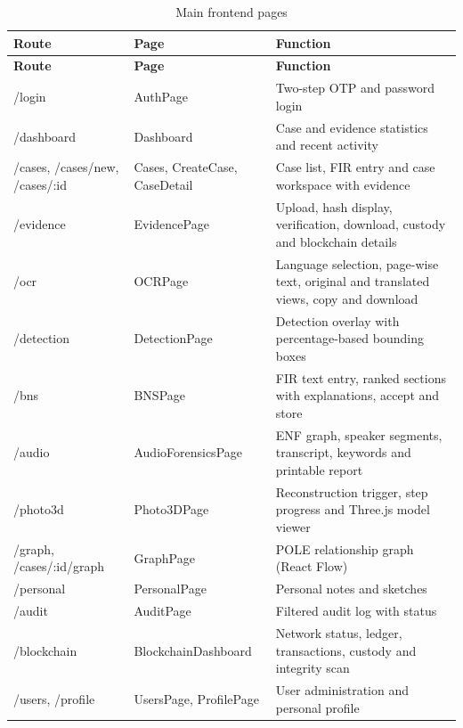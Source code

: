 \documentclass[12pt,a4paper,oneside]{report}
\begin{document}
{\footnotesize
\setlength{\tabcolsep}{3pt}
\renewcommand{\arraystretch}{1.15}
\begin{longtable}{|>{\raggedright\arraybackslash}p{4.17cm}|>{\raggedright\arraybackslash}p{3.41cm}|>{\raggedright\arraybackslash}p{6.63cm}|}
\caption{Main frontend pages}\\
\hline
\rowcolor{headfill}\textbf{Route} & \textbf{Page} & \textbf{Function} \\ \hline
\endfirsthead
\hline
\rowcolor{headfill}\textbf{Route} & \textbf{Page} & \textbf{Function} \\ \hline
\endhead
\hline \endfoot
/login & AuthPage & Two-step OTP and password login \\ \hline
/dashboard & Dashboard & Case and evidence statistics and recent activity \\ \hline
/cases, /cases/new, /cases/:id & Cases, CreateCase, CaseDetail & Case list, FIR entry and case workspace with evidence \\ \hline
/evidence & EvidencePage & Upload, hash display, verification, download, custody and blockchain details \\ \hline
/ocr & OCRPage & Language selection, page-wise text, original and translated views, copy and download \\ \hline
/detection & DetectionPage & Detection overlay with percentage-based bounding boxes \\ \hline
/bns & BNSPage & FIR text entry, ranked sections with explanations, accept and store \\ \hline
/audio & AudioForensicsPage & ENF graph, speaker segments, transcript, keywords and printable report \\ \hline
/photo3d & Photo3DPage & Reconstruction trigger, step progress and Three.js model viewer \\ \hline
/graph, /cases/:id/graph & GraphPage & POLE relationship graph (React Flow) \\ \hline
/personal & PersonalPage & Personal notes and sketches \\ \hline
/audit & AuditPage & Filtered audit log with status \\ \hline
/blockchain & BlockchainDashboard & Network status, ledger, transactions, custody and integrity scan \\ \hline
/users, /profile & UsersPage, ProfilePage & User administration and personal profile \\ \hline
\end{longtable}
}
\end{document}
